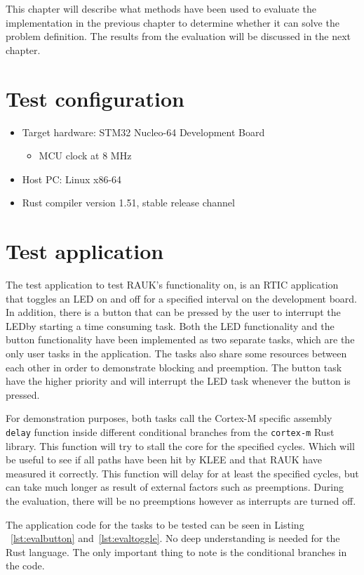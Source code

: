 This chapter will describe what methods have been used to evaluate the
implementation in the previous chapter to determine whether it can solve the
problem definition. The results from the evaluation will be discussed in
the next chapter.

\section{Test configuration}
\begin{itemize}
    \item Target hardware: STM32 Nucleo-64 Development Board
    \begin{itemize}
       \item MCU clock at 8 MHz
    \end{itemize}
    \item Host PC\@: Linux x86-64 
    \item Rust compiler version 1.51, stable release channel
\end{itemize}

\section{Test application}
The test application to test RAUK's functionality on, is an RTIC application
that toggles an LED on and off for a specified interval on the development board. In
addition, there is a button that can be pressed by the user to interrupt the
LED\@ by starting a time consuming task. Both the LED functionality and the
button functionality have been implemented as two separate tasks, which are the
only user tasks in the application. The tasks also share some resources between
each other in order to demonstrate blocking and preemption. The button task
have the higher priority and will interrupt the LED task whenever the button is
pressed.

For demonstration purposes, both tasks call the Cortex-M specific assembly
\texttt{delay} function inside different conditional branches from the
\texttt{cortex-m} Rust library. This function will try to stall the core for
the specified cycles. Which will be useful to see if all paths have been hit by
KLEE and that RAUK have measured it correctly. This function will delay for at
least the specified cycles, but can take much longer as result of external factors
such as preemptions. During the evaluation, there will be no preemptions however as
interrupts are turned off.

The application code for the tasks to be tested can be seen in Listing
~\ref{lst:evalbutton} and~\ref{lst:evaltoggle}. No deep understanding is
needed for the Rust language. The only important thing to note is the
conditional branches in the code.


